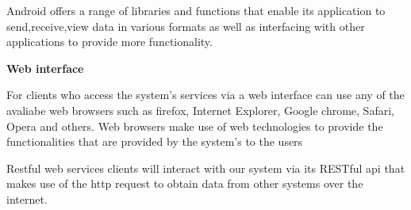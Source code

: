 \documentclass[a4paper,12pt]{article}
\begin{document}
\begin{flushleft}
Android offers a range of libraries and functions that enable its application to send,receive,view data in various formats as well as interfacing with other applications to provide more functionality.

\textbf{Web interface} 

For clients who access the system's services via a web interface can use any of the avaliabe web browsers such as firefox, Internet Explorer, Google chrome, Safari, Opera and others. Web browsers  make use of web technologies to provide the functionalities that are provided by the system's to the users

Restful web services clients will interact with our system via its RESTful api that makes use of the http request to obtain data from other systems over the internet.
\end{flushleft}
\end{document}
